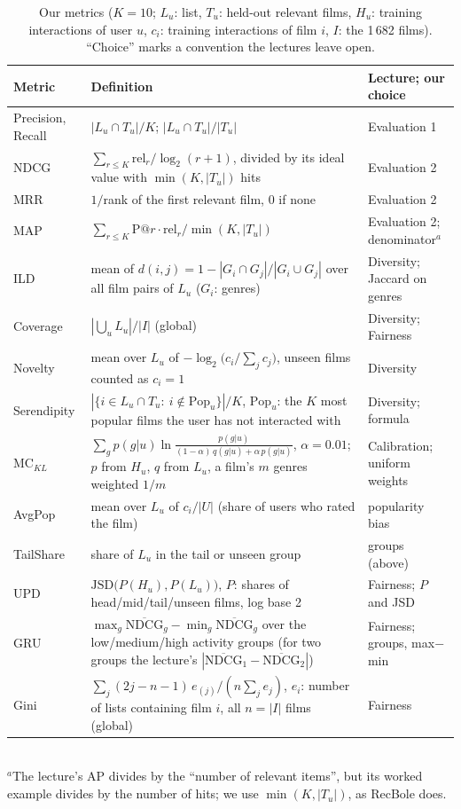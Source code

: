 \documentclass[12pt,a4paper]{article}
\begin{document}
\begin{table}[htbp]
  \centering
  \caption{Our metrics ($K{=}10$; $L_u$: list, $T_u$: held-out relevant films, $H_u$: training interactions of user
  $u$, $c_i$: training interactions of film $i$, $I$: the 1\,682 films). ``Choice'' marks a convention the lectures leave open.}
  \label{tab:metric-definitions}
  \small\setlength{\tabcolsep}{4pt}
  \begin{tabular}{@{}p{2.3cm}p{9.1cm}p{4.3cm}@{}}
    \toprule
    Metric & Definition & Lecture; our choice \\
    \midrule
    Precision, Recall & $|L_u\cap T_u|/K$;\; $|L_u\cap T_u|/|T_u|$ & Evaluation 1 \\
    NDCG & $\sum_{r\leq K}\mathrm{rel}_r/\log_2(r{+}1)$, divided by its ideal value with $\min(K,|T_u|)$ hits & Evaluation 2 \\
    MRR & $1/$rank of the first relevant film, 0 if none & Evaluation 2 \\
    MAP & $\sum_{r\leq K}\mathrm{P@}r\cdot\mathrm{rel}_r/\min(K,|T_u|)$ & Evaluation 2; denominator$^{a}$ \\
    ILD & mean of $d(i,j)=1-|G_i\cap G_j|/|G_i\cup G_j|$ over all film pairs of $L_u$ ($G_i$: genres) & Diversity; Jaccard on genres \\
    Coverage & $|\bigcup_u L_u|/|I|$ (global) & Diversity; Fairness \\
    Novelty & mean over $L_u$ of $-\log_2\bigl(c_i/\sum_j c_j\bigr)$, unseen films counted as $c_i{=}1$ & Diversity \\
    Serendipity & $|\{i\in L_u\cap T_u:\ i\notin \mathrm{Pop}_u\}|/K$, $\mathrm{Pop}_u$: the $K$ most popular films the user has not interacted with & Diversity; formula \\
    MC$_{KL}$ & $\sum_g p(g|u)\ln\frac{p(g|u)}{(1-\alpha)\,q(g|u)+\alpha\, p(g|u)}$, $\alpha{=}0.01$; $p$ from $H_u$, $q$ from $L_u$, a film's $m$ genres weighted $1/m$ & Calibration; uniform weights \\
    AvgPop & mean over $L_u$ of $c_i/|U|$ (share of users who rated the film) & popularity bias \\
    TailShare & share of $L_u$ in the tail or unseen group & groups (above) \\
    UPD & $\mathrm{JSD}\bigl(P(H_u),P(L_u)\bigr)$, $P$: shares of head/mid/tail/unseen films, log base 2 & Fairness; $P$ and JSD \\
    GRU & $\max_g\overline{\mathrm{NDCG}}_g-\min_g\overline{\mathrm{NDCG}}_g$ over the low/medium/high activity groups (for two groups the lecture's $|\overline{\mathrm{NDCG}}_{1}-\overline{\mathrm{NDCG}}_{2}|$) & Fairness; groups, max$-$min \\
    Gini & $\sum_j(2j-n-1)\,e_{(j)}/(n\sum_j e_j)$, $e_i$: number of lists containing film $i$, all $n{=}|I|$ films (global) & Fairness \\
    \bottomrule
  \end{tabular}\\[2pt]
  {\footnotesize $^{a}$The lecture's AP divides by the ``number of relevant items'', but its worked example divides
  by the number of hits; we use $\min(K,|T_u|)$, as RecBole does.}
\end{table}
\end{document}
